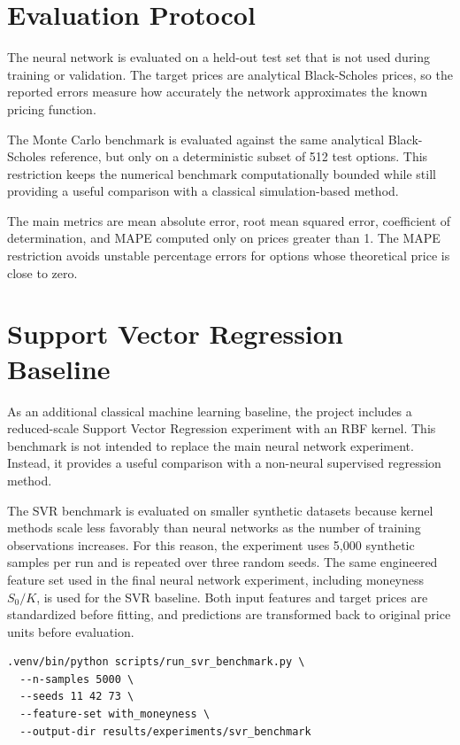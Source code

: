 \section{Evaluation Protocol}

The neural network is evaluated on a held-out test set that is not used during training or validation.
The target prices are analytical Black-Scholes prices, so the reported errors measure how accurately the network approximates the known pricing function.

The Monte Carlo benchmark is evaluated against the same analytical Black-Scholes reference, but only on a deterministic subset of 512 test options.
This restriction keeps the numerical benchmark computationally bounded while still providing a useful comparison with a classical simulation-based method.

The main metrics are mean absolute error, root mean squared error, coefficient of determination, and MAPE computed only on prices greater than 1.
The MAPE restriction avoids unstable percentage errors for options whose theoretical price is close to zero.

\section{Support Vector Regression Baseline}

As an additional classical machine learning baseline, the project includes a reduced-scale Support Vector Regression experiment with an RBF kernel.
This benchmark is not intended to replace the main neural network experiment.
Instead, it provides a useful comparison with a non-neural supervised regression method.

The SVR benchmark is evaluated on smaller synthetic datasets because kernel methods scale less favorably than neural networks as the number of training observations increases.
For this reason, the experiment uses 5,000 synthetic samples per run and is repeated over three random seeds.
The same engineered feature set used in the final neural network experiment, including moneyness $S_0/K$, is used for the SVR baseline.
Both input features and target prices are standardized before fitting, and predictions are transformed back to original price units before evaluation.

\begin{lstlisting}[style=pythonstyle, caption={Command used for the SVR benchmark.}]
.venv/bin/python scripts/run_svr_benchmark.py \
  --n-samples 5000 \
  --seeds 11 42 73 \
  --feature-set with_moneyness \
  --output-dir results/experiments/svr_benchmark
\end{lstlisting}

